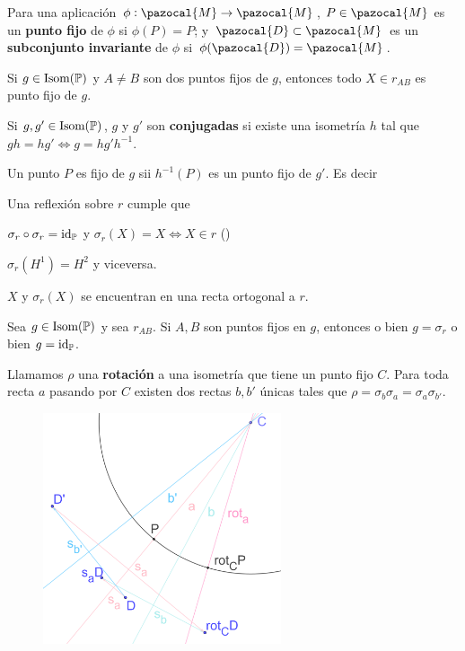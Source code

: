 
 Para una aplicación $\phi: \pazocal{M} \rightarrow \pazocal{M}$, $P\in \pazocal{M}$ es un \textbf{punto fijo} de $\phi$ si $\phi(P) = P$; y $\pazocal{D} \subset \pazocal{M}$ es un \textbf{subconjunto invariante} de $\phi$ si $\phi(\pazocal{D}) = \pazocal{M}$.

 Si $g \in \iso(\P)$ y $A \neq B$ son dos puntos fijos de $g$, entonces todo $X \in r_{AB}$ es punto fijo de $g$.


 Si $g, g' \in \iso(\P)$, $g$ y $g'$ son \textbf{conjugadas}
si existe una isometría $h$ tal que $gh = hg' \iff g = hg'h^{-1}$.

 Un punto $P$ es fijo de $g$ sii $h^{-1}(P)$ es un punto fijo de $g'$. Es decir


 Una reflexión sobre $r$ cumple que
\begin{itemizex}
	\item $\sigma_r\circ\sigma_r = \text{id}_{\P}$ y $\sigma_r(X) = X \iff X \in r$ ()
	\item $\sigma_r(H^1) = H^2$ y viceversa.
	\item $X$ y $\sigma_r(X)$ se encuentran en una recta ortogonal a $r$.
\end{itemizex} 
	 
\importante{} Sea $g\in \iso(\P)$ y sea $r_{AB}$. Si $A, B$ son puntos fijos en $g$, entonces o bien $g = \sigma_r$ o bien $g = \text{id}_\P$. 

 Llamamos $\rho$ una \textbf{rotación} a una isometría que tiene un punto fijo $C$. Para toda recta $a$ pasando por $C$ existen dos rectas $b, b'$ únicas tales que $\rho = \sigma_b\sigma_a = \sigma_a\sigma_{b'}$.

\begin{figure}[H]
	\centering
	\includegraphics[width=7cm]{figuras/3-9.png}
	\vspace{-1em}
\end{figure}

